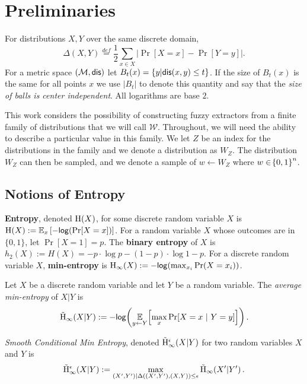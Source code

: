
\section{Preliminaries}
\label{sec:prelim}
For distributions $X, Y$ over the same discrete domain,
\[
\Delta(X, Y)\overset{def}= \frac{1}{2}\sum_{x \in X} \left| \Pr[X=x] - \Pr[Y=y]\right|.
\]
For a metric space $(\mathcal{M}, \mathsf{dis})$ let $B_t(x) = \{y | \mathsf{dis}(x, y)\le t\}$. If the size of $B_t(x)$ is the same for all points $x$ we use $|B_t|$ to denote this quantity and say that the \emph{size of balls is center independent}.  All logarithms are base $2$.

This work considers the possibility of constructing fuzzy extractors from a finite family of distributions that we will call $\mathcal{W}$. 
Throughout, we will need the ability to describe a particular value in this family.  
We let $Z$ be an index for the distributions in the family and we denote a distribution as $W_Z$. 
The distribution $W_Z$ can then be sampled, and we denote a sample of $w\leftarrow W_Z$ where  $w \in \!\left\{ 0,1 \right\}^{n}$.

\subsection{Notions of Entropy}
    \textbf{Entropy}, denoted $\mathrm{H}\!\left(X\right)$, for some discrete random variable $X$ is $\mathrm{H}\!\left(X\right) := \operatorname*{\mathbb{E}}_x\left[-\mathsf{log}\!\left(\Pr[X=x]\right)\right]$. 
    For a random variable $X$ whose outcomes are in $\{0,1\}$, let $\Pr[X=1] = p$. The \textbf{binary entropy} of $X$ is  $h_2(X) :=H(X)=-p\cdot\log{p} - (1-p)\cdot\log{1-p}.$ 
For a discrete random variable $X$, 
    \textbf{min-entropy} is $\mathrm{H}_{\infty}\!\left(X\right) := -\mathsf{log}\!\left(\max_{x_i} \Pr(X=x_i)\right)$.  
\begin{definition}
Let $X$ be a discrete random variable and let $Y$ be a random variable.  The \emph{average min-entropy} of $X|Y$ is  \[ \tilde{\mathrm{H}}_{\infty}\!\left(X|Y\right) := -\mathsf{log}\!\left(\operatorname*{\mathbb{E}}\limits_{y \leftarrow Y}\!\left[\max\limits_{x} \Pr\!\left[X = x\ |\ Y = y\right]\right]\right).\] 
\end{definition}

\begin{definition}
    \emph{Smooth Conditional Min Entropy}, denoted $\tilde{\mathrm{H}}_\infty^\epsilon(X|Y)$ for two random variables $X$ and $Y$ is \[\tilde{\mathrm{H}}_\infty^\epsilon(X|Y):=\max_{(X',Y') | \Delta((X', Y'), (X, Y))\le \epsilon} \tilde{\mathrm{H}}_{\infty}\!\left(X'|Y'\right).
    \] 
\end{definition}

